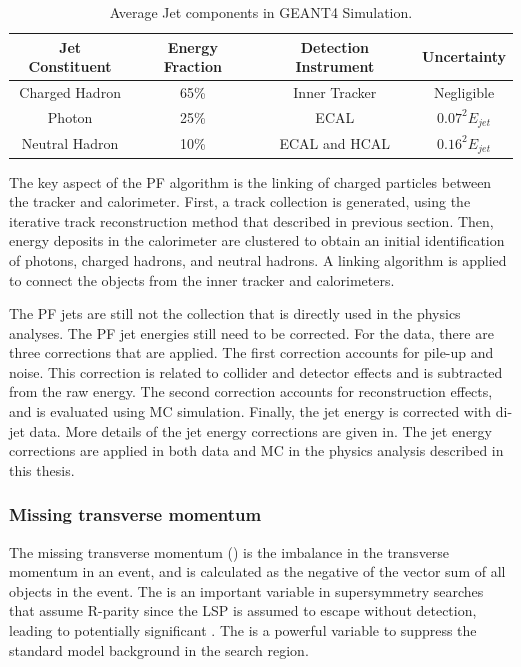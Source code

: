 \begin{table}[htbp]
\fontsize{10 pt}{1.2 em}
\selectfont
\begin{centering}
\caption{\label{tab:c3cmsjetf} Average Jet components in GEANT4 Simulation.}
\hspace*{-4ex}
\begin{tabular}{|c|c|c|c|}
\hline
Jet Constituent & Energy Fraction & Detection Instrument & Uncertainty \\
\hline
Charged Hadron  & 65\% & Inner Tracker & Negligible \\
\hline
Photon          & 25\% & ECAL &  $0.07^{2}E_{jet}$ \\
\hline
Neutral Hadron  & 10\% & ECAL and HCAL & $0.16^{2}E_{jet}$ \\
\hline
\end{tabular}
\par\end{centering}
\end{table}

The key aspect of the PF algorithm is the linking of charged particles between the tracker and calorimeter. First, a track collection is generated, using the iterative track reconstruction method that described in previous section. Then, energy deposits in the calorimeter are clustered to obtain an initial identification of photons, charged hadrons, and neutral hadrons. A linking algorithm\cite{CMS-PAS-PFT-09-001} is applied to connect the objects from the inner tracker and calorimeters. 

The PF jets are still not the collection that is directly used in the physics analyses. The PF jet energies still need to be corrected. For the data, there are three corrections that are applied. The first correction accounts for pile-up and noise. This correction is related to collider and detector effects and is subtracted from the raw energy. The second correction accounts for reconstruction effects, and is evaluated using MC simulation. Finally, the jet energy is corrected with di-jet data. More details of the jet energy corrections are given in\cite{1748-0221-6-11-P11002}. The jet energy corrections are applied in both data and MC in the physics analysis described in this thesis. 

\subsubsection{Missing transverse momentum}

The missing transverse momentum (\MET) is the imbalance in the transverse momentum in an event, and is calculated as the negative of the vector sum of all objects in the event. The \MET is an important variable in supersymmetry searches that assume R-parity since the LSP is assumed to escape without detection, leading to potentially significant \MET. The \MET is a powerful variable to suppress the standard model background in the search region. 

